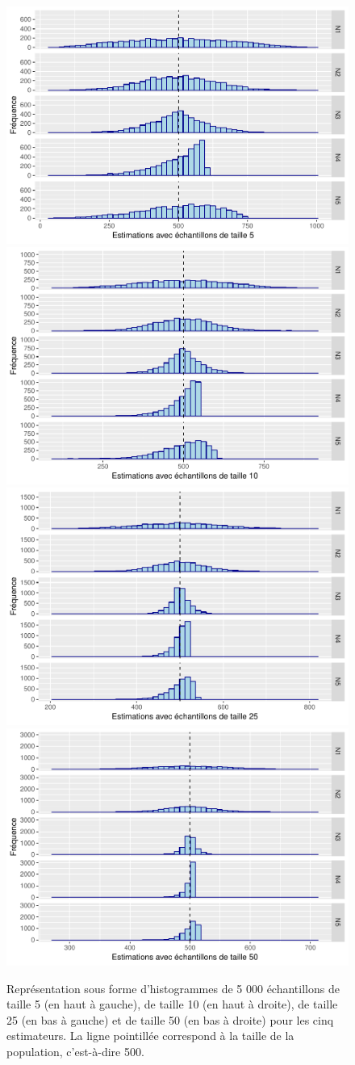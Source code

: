 \documentclass[10pt]{article}
\begin{document}
\begin{figure}[!htb]

{\centering \includegraphics[width=0.48\linewidth]{serial_number_amq_files/figure-latex/fig-ech-1} \includegraphics[width=0.48\linewidth]{serial_number_amq_files/figure-latex/fig-ech-2} \includegraphics[width=0.48\linewidth]{serial_number_amq_files/figure-latex/fig-ech-3} \includegraphics[width=0.48\linewidth]{serial_number_amq_files/figure-latex/fig-ech-4} 

}

\caption{Représentation sous forme d'histogrammes de 5 000 échantillons de taille 5 (en haut à gauche), de taille 10 (en haut à droite), de taille 25 (en bas à gauche) et de taille 50 (en bas à droite) pour les cinq estimateurs. La ligne pointillée correspond à la taille de la population, c'est-à-dire 500.}\label{fig:fig-ech}
\end{figure}
\end{document}
